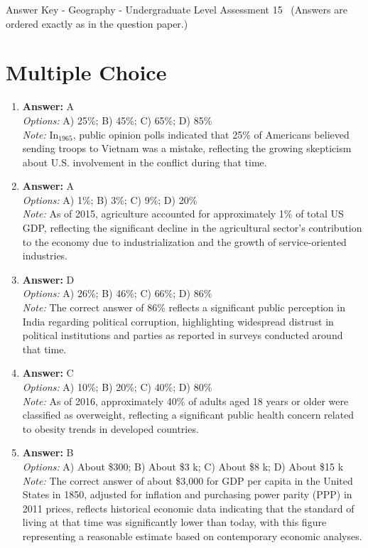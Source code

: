 \documentclass[12pt]{article}
\begin{document}
\begin{center}
Answer Key - Geography - Undergraduate Level Assessment 15 \
\small (Answers are ordered exactly as in the question paper.)
\end{center}

\section*{Multiple Choice}
\begin{enumerate}[label=\arabic*.]
\item \textbf{Answer:} A
\\ \textit{Options:} A) 25\%; B) 45\%; C) 65\%; D) 85\%
\\ \textit{Note:} In$_{1965}$, public opinion polls indicated that 25\% of Americans believed sending troops to Vietnam was a mistake, reflecting the growing skepticism about U.S. involvement in the conflict during that time.
\item \textbf{Answer:} A
\\ \textit{Options:} A) 1\%; B) 3\%; C) 9\%; D) 20\%
\\ \textit{Note:} As of 2015, agriculture accounted for approximately 1\% of total US GDP, reflecting the significant decline in the agricultural sector's contribution to the economy due to industrialization and the growth of service-oriented industries.
\item \textbf{Answer:} D
\\ \textit{Options:} A) 26\%; B) 46\%; C) 66\%; D) 86\%
\\ \textit{Note:} The correct answer of 86\% reflects a significant public perception in India regarding political corruption, highlighting widespread distrust in political institutions and parties as reported in surveys conducted around that time.
\item \textbf{Answer:} C
\\ \textit{Options:} A) 10\%; B) 20\%; C) 40\%; D) 80\%
\\ \textit{Note:} As of 2016, approximately 40\% of adults aged 18 years or older were classified as overweight, reflecting a significant public health concern related to obesity trends in developed countries.
\item \textbf{Answer:} B
\\ \textit{Options:} A) About \$300; B) About \$3 k; C) About \$8 k; D) About \$15 k
\\ \textit{Note:} The correct answer of about \$3,000 for GDP per capita in the United States in 1850, adjusted for inflation and purchasing power parity (PPP) in 2011 prices, reflects historical economic data indicating that the standard of living at that time was significantly lower than today, with this figure representing a reasonable estimate based on contemporary economic analyses.
\end{enumerate}
\end{document}
